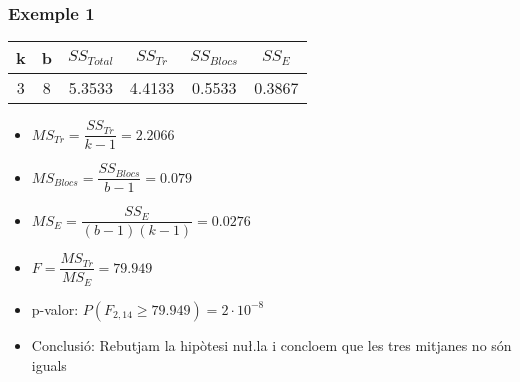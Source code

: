 \documentclass[12pt,t]{beamer}
\renewcommand{\geq}{\geqslant}
\theoremstyle{plain}
\theoremstyle{definition}
\begin{document}
\begin{frame}
\frametitle{Exemple 1}
\vspace*{-3ex}

\begin{center}
\begin{tabular}{cccccc}
k & b & $SS_{Total}$ & $SS_{Tr}$ & $SS_{Blocs}$ & $SS_E$\\ \hline
3 & 8 & 5.3533  & 4.4133 & 0.5533  & 0.3867
\end{tabular}
\end{center}

\begin{itemize}
\item $MS_{Tr}=\dfrac{SS_{Tr}}{k-1}=2.2066$
\medskip

\item $MS_{Blocs}=\dfrac{SS_{Blocs}}{b-1}=0.079$
\medskip

\item $MS_E = \dfrac{SS_E}{(b-1) (k-1)}=0.0276$
\medskip

\item $F=\dfrac{MS_{Tr}}{MS_E}=79.949$
\medskip

\item p-valor: $P(F_{2,14}\geq 79.949)=2\cdot 10^{-8}$
\medskip

\item Conclusió: Rebutjam la hipòtesi nu\l.la i concloem que les tres mitjanes no són iguals

\end{itemize}
\end{frame}
\end{document}
